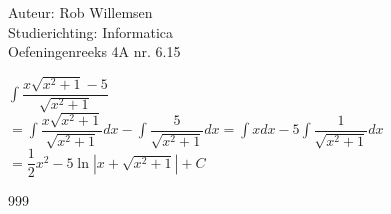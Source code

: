 \documentclass[a4paper]{article}
\newcommand{\dint}{\displaystyle\int}
\begin{document}
\noindent \large Auteur: Rob Willemsen \\
\noindent \large Studierichting: Informatica \\
\noindent \large Oefeningenreeks 4A nr. 6.15 \\

\medskip

\normalsize

$\dint \dfrac{x\sqrt{x^2 + 1} - 5}{\sqrt{x^2 + 1}}$ \\

$= \dint \dfrac{x\sqrt{x^2 + 1}}{\sqrt{x^2 + 1}} dx - \dint \dfrac{5}{\sqrt{x^2 + 1}} dx = \dint x dx - 5 \dint \dfrac{1}{\sqrt{x^2+1}} dx$ \\

$= \dfrac{1}{2}x^2 - 5 \ln|x + \sqrt{x^2 + 1}| + C$ \\

\begin{thebibliography}{999}
\end{thebibliography}
\end{document}
